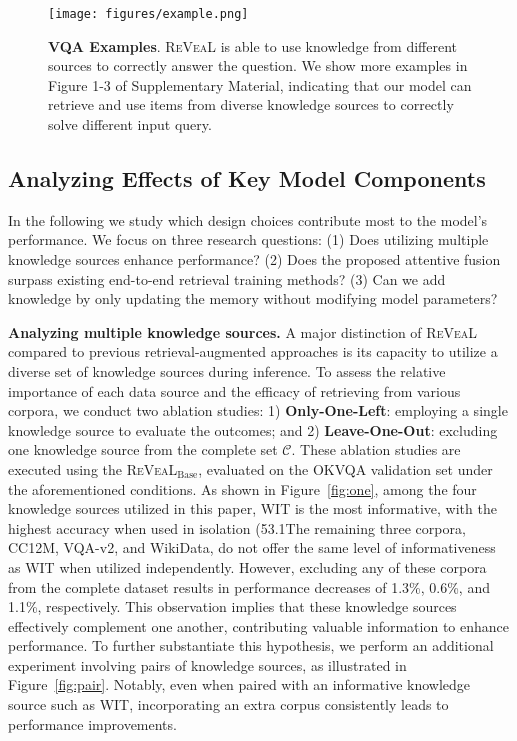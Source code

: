 \documentclass[10pt,twocolumn,letterpaper]{article}
\newcommand{\method}{R\textsc{e}V\textsc{ea}L\xspace}
\begin{document}
\begin{figure}[t!]
    \centering
    \vspace{-.1in}
    \texttt{[image: figures/example.png]}
        \vspace{-.2in}
    \caption{\textbf{VQA Examples}. \method is able to use knowledge from different sources to correctly answer the question. We show more examples in Figure 1-3 of Supplementary Material, indicating that our model can retrieve and use items from diverse knowledge sources to correctly solve different input query.}
    \label{fig:example}
\end{figure}


\subsection{Analyzing Effects of Key Model Components}\label{sec:ablation}
In the following we study which design choices contribute most to the model's performance. We focus on three research questions:
(1) Does utilizing multiple knowledge sources enhance performance?
(2) Does the proposed attentive fusion surpass existing end-to-end retrieval training methods?
(3) Can we add knowledge by only updating the memory without modifying model parameters?

\textbf{Analyzing multiple knowledge sources.}
A major distinction of \method compared to previous retrieval-augmented approaches is its capacity to utilize a diverse set of knowledge sources during inference. To assess the relative importance of each data source and the efficacy of retrieving from various corpora, we conduct two ablation studies: 1) \textbf{Only-One-Left}: employing a single knowledge source to evaluate the outcomes; and 2) \textbf{Leave-One-Out}: excluding one knowledge source from the complete set $\mathcal{C}$. These ablation studies are executed using the \method$_{\text{Base}}$, evaluated on the OKVQA validation set under the aforementioned conditions.
As shown in Figure~\ref{fig:one}, among the four knowledge sources utilized in this paper, WIT is the most informative, with the highest accuracy when used in isolation (53.1The remaining three corpora, CC12M, VQA-v2, and WikiData, do not offer the same level of informativeness as WIT when utilized independently. However, excluding any of these corpora from the complete dataset results in performance decreases of 1.3\%, 0.6\%, and 1.1\%, respectively. This observation implies that these knowledge sources effectively complement one another, contributing valuable information to enhance performance. To further substantiate this hypothesis, we perform an additional experiment involving pairs of knowledge sources, as illustrated in Figure~\ref{fig:pair}. Notably, even when paired with an informative knowledge source such as WIT, incorporating an extra corpus consistently leads to performance improvements.
\end{document}
